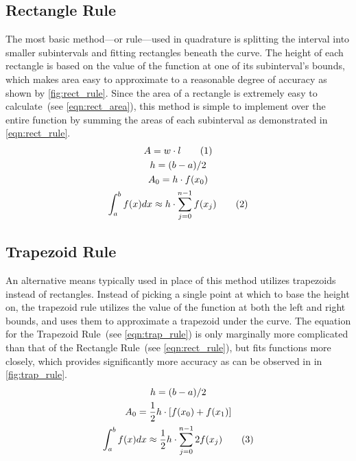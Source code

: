\documentclass{paper}
\begin{document}
\subsection{Rectangle Rule}
\label{sec:rect_rule}
The most basic method---or rule---used in quadrature is splitting the interval into smaller subintervals and fitting rectangles beneath the curve.
The height of each rectangle is based on the value of the function at one of its subinterval's bounds, which makes area easy to approximate to a reasonable degree of accuracy as shown by \cref{fig:rect_rule}.
Since the area of a rectangle is extremely easy to calculate~(see \cref{eqn:rect_area}), this method is simple to implement over the entire function by summing the areas of each subinterval as demonstrated in \cref{eqn:rect_rule}.\autocite{num_methods}
%
\begin{gather*}
    A = w \cdot l \tageq\label{eqn:rect_area}                                           \\
    h = (b - a) / 2                                                                     \\
    A_{0} = h \cdot f(x_0)                                                         \\
    \int_a^b f(x) dx \approx h \cdot \sum^{n-1}_{j=0}f(x_j) \tageq\label{eqn:rect_rule}
\end{gather*}
%

%
\subsection{Trapezoid Rule}
\label{sec:trap_rule}
An alternative means typically used in place of this method utilizes trapezoids instead of rectangles.
Instead of picking a single point at which to base the height on, the trapezoid rule utilizes the value of the function at both the left and right bounds, and uses them to approximate a trapezoid under the curve.
The equation for the Trapezoid Rule~(see \cref{eqn:trap_rule}) is only marginally more complicated than that of the Rectangle Rule~(see \cref{eqn:rect_rule}), but fits functions more closely, which provides significantly more accuracy as can be observed in in \cref{fig:trap_rule}.\autocite{num_methods}
%
\begin{gather*}
    h = (b - a) / 2                                                                                 \\
    A_{0} = \frac{1}{2} h \cdot \left[f(x_0) + f(x_1)\right]                                   \\
    \int_a^b f(x) dx \approx \frac{1}{2}h \cdot \sum^{n-1}_{j=0}2f(x_j) \tageq\label{eqn:trap_rule}
\end{gather*}
%

%
\end{document}
